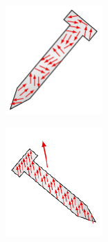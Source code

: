 \documentclass{report}
\begin{document}
\begin{figure}[h]%
\centering
\begin{minipage}{.45\textwidth}
      \centering
      \includegraphics[width=.42\linewidth]{figures/spines_random.pdf}
      \label{fig:spines_random}
    
  \end{minipage}%
  \begin{minipage}{.5\textwidth}
    \centering
    \includegraphics[angle=270, origin=c, width=.45\linewidth]{figures/spines_organized.pdf}
    \label{fig:spines_organized}
  \end{minipage}
\label{fig:spines}
\end{figure}
\end{document}

